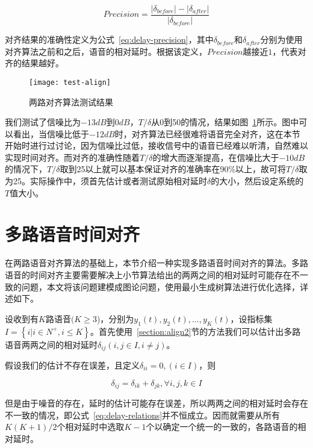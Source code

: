 \begin{equation}\label{eq:delay-precision}
Precision=\frac{|\delta_{before}|-|\delta_{after}|}{|\delta_{before}|}
\end{equation}

对齐结果的准确性定义为公式~\ref{eq:delay-precision}，其中$\delta_{before}$和$\delta_{after}$分别为使用对齐算法之前和之后，语音的相对延时。根据该定义，$Precision$越接近$1$，代表对齐的结果越好。

\begin{figure}
\centering
\texttt{[image: test-align]}
\caption{两路对齐算法测试结果\label{fig:test-align}}
\end{figure}

我们测试了信噪比为$-13dB$到$0dB$，$T/\delta$从0到50的情况，结果如图~\ref{fig:test-align}所示。图中可以看出，当信噪比低于$-12dB$时，对齐算法已经很难将语音完全对齐，这在本节开始时进行过讨论，因为信噪比过低，接收信号中的语音已经难以听清，自然难以实现时间对齐。而对齐的准确性随着$T/\delta$的增大而逐渐提高，在信噪比大于$-10dB$的情况下，$T/\delta$取到25以上就可以基本保证对齐的准确率在90\%以上，故可将$T/\delta$取为25。实际操作中，须首先估计或者测试原始相对延时$\delta$的大小，然后设定系统的$T$值大小。


\section{多路语音时间对齐} \label{section:align-multi}

在两路语音对齐算法的基础上，本节介绍一种实现多路语音时间对齐的算法。多路语音的时间对齐主要需要解决上小节算法给出的两两之间的相对延时可能存在不一致的问题，本文将该问题建模成图论问题，使用最小生成树算法进行优化选择，详述如下。

设收到有$K$路语音$(K\geq3$)，分别为$y_1(t), y_2(t), ..., y_K(t)$，设指标集$I=\left\{i|i\in N^+, i\leq K\right\}$。首先使用~\ref{section:align2}节的方法我们可以估计出多路语音两两之间的相对延时$\delta_{ij}  (i,j\in I,i\neq j)$。

假设我们的估计不存在误差，且定义$\delta_{ii}=0,(i \in I)$，则

\begin{equation}\label{eq:delay-relations}
\delta_{ij}=\delta_{ik}+\delta_{jk}, \forall i,j,k \in I
\end{equation}

但是由于噪音的存在，延时的估计可能存在误差，所以两两之间的相对延时会存在不一致的情况，即公式~\ref{eq:delay-relations}并不恒成立。因而就需要从所有$K(K+1)/2$个相对延时中选取$K-1$个以确定一个统一的一致的，各路语音的相对延时。

